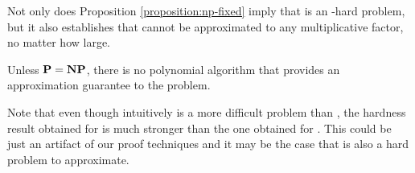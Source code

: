 Not only does Proposition \ref{proposition:np-fixed} imply that \prbrmfixed is an \np-hard problem, 
but it also establishes that \prbrmfixed cannot be approximated to any multiplicative factor, 
no matter how large.

\begin{corollary}
Unless $\textbf{P} = \textbf{NP}$, there is no polynomial 
algorithm
that provides an approximation guarantee
to the \prbrmfixed problem.
\end{corollary}

Note that even though intuitively 
\prbrm is a more difficult problem than \prbrmfixed, 
the hardness result obtained for \prbrmfixed is much stronger
than the one obtained for \prbrm.
This could be just an artifact of our proof techniques
and it may be the case that \prbrm is also a hard problem to approximate. 



